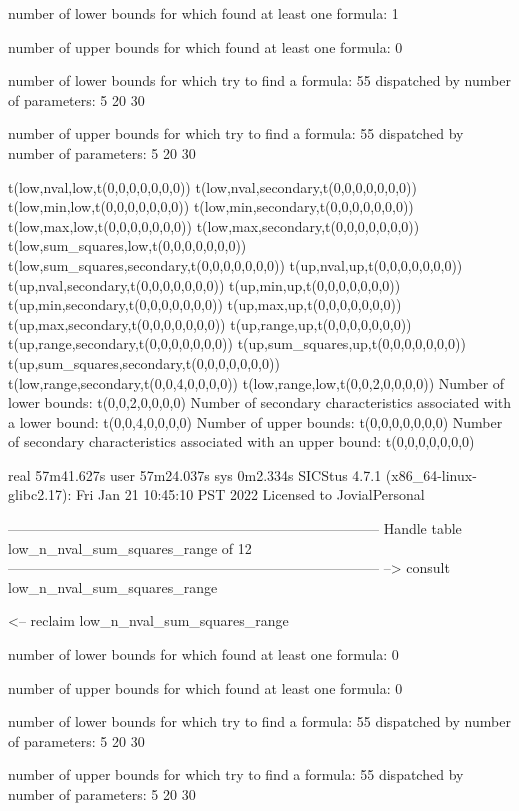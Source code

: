 number of lower bounds for which found at least one formula: 1

number of upper bounds for which found at least one formula: 0

number of lower bounds for which try to find a formula: 55
dispatched by number of parameters: 5  20  30

number of upper bounds for which try to find a formula: 55
dispatched by number of parameters: 5  20  30

t(low,nval,low,t(0,0,0,0,0,0,0))
t(low,nval,secondary,t(0,0,0,0,0,0,0))
t(low,min,low,t(0,0,0,0,0,0,0))
t(low,min,secondary,t(0,0,0,0,0,0,0))
t(low,max,low,t(0,0,0,0,0,0,0))
t(low,max,secondary,t(0,0,0,0,0,0,0))
t(low,sum_squares,low,t(0,0,0,0,0,0,0))
t(low,sum_squares,secondary,t(0,0,0,0,0,0,0))
t(up,nval,up,t(0,0,0,0,0,0,0))
t(up,nval,secondary,t(0,0,0,0,0,0,0))
t(up,min,up,t(0,0,0,0,0,0,0))
t(up,min,secondary,t(0,0,0,0,0,0,0))
t(up,max,up,t(0,0,0,0,0,0,0))
t(up,max,secondary,t(0,0,0,0,0,0,0))
t(up,range,up,t(0,0,0,0,0,0,0))
t(up,range,secondary,t(0,0,0,0,0,0,0))
t(up,sum_squares,up,t(0,0,0,0,0,0,0))
t(up,sum_squares,secondary,t(0,0,0,0,0,0,0))
t(low,range,secondary,t(0,0,4,0,0,0,0))
t(low,range,low,t(0,0,2,0,0,0,0))
Number of lower bounds:                                             t(0,0,2,0,0,0,0)
Number of secondary characteristics associated with a lower bound:  t(0,0,4,0,0,0,0)
Number of upper bounds:                                             t(0,0,0,0,0,0,0)
Number of secondary characteristics associated with an upper bound: t(0,0,0,0,0,0,0)

real	57m41.627s
user	57m24.037s
sys	0m2.334s
SICStus 4.7.1 (x86_64-linux-glibc2.17): Fri Jan 21 10:45:10 PST 2022
Licensed to JovialPersonal


--------------------------------------------------------------------------------
Handle table low_n_nval_sum_squares_range of 12
--------------------------------------------------------------------------------
--> consult low_n_nval_sum_squares_range

<-- reclaim low_n_nval_sum_squares_range

number of lower bounds for which found at least one formula: 0

number of upper bounds for which found at least one formula: 0

number of lower bounds for which try to find a formula: 55
dispatched by number of parameters: 5  20  30

number of upper bounds for which try to find a formula: 55
dispatched by number of parameters: 5  20  30

